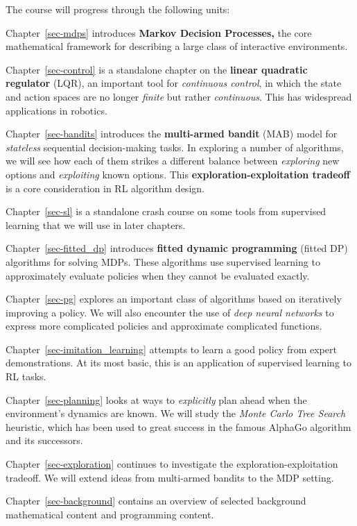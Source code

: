\documentclass[
  letterpaper,
  DIV=11,
  numbers=noendperiod]{scrreprt}
\theoremstyle{plain}
\theoremstyle{plain}
\theoremstyle{definition}
\theoremstyle{definition}
\theoremstyle{remark}
\begin{document}

The course will progress through the following units:

Chapter~\ref{sec-mdps} introduces \textbf{Markov Decision Processes,}
the core mathematical framework for describing a large class of
interactive environments.

Chapter~\ref{sec-control} is a standalone chapter on the \textbf{linear
quadratic regulator} (LQR), an important tool for \emph{continuous
control}, in which the state and action spaces are no longer
\emph{finite} but rather \emph{continuous}. This has widespread
applications in robotics.

Chapter~\ref{sec-bandits} introduces the \textbf{multi-armed bandit}
(MAB) model for \emph{stateless} sequential decision-making tasks. In
exploring a number of algorithms, we will see how each of them strikes a
different balance between \emph{exploring} new options and
\emph{exploiting} known options. This \textbf{exploration-exploitation
tradeoff} is a core consideration in RL algorithm design.

Chapter~\ref{sec-sl} is a standalone crash course on some tools from
supervised learning that we will use in later chapters.

Chapter~\ref{sec-fitted_dp} introduces \textbf{fitted dynamic
programming} (fitted DP) algorithms for solving MDPs. These algorithms
use supervised learning to approximately evaluate policies when they
cannot be evaluated exactly.

Chapter~\ref{sec-pg} explores an important class of algorithms based on
iteratively improving a policy. We will also encounter the use of
\emph{deep neural networks} to express more complicated policies and
approximate complicated functions.

Chapter~\ref{sec-imitation_learning} attempts to learn a good policy
from expert demonstrations. At its most basic, this is an application of
supervised learning to RL tasks.

Chapter~\ref{sec-planning} looks at ways to \emph{explicitly} plan ahead
when the environment's dynamics are known. We will study the \emph{Monte
Carlo Tree Search} heuristic, which has been used to great success in
the famous AlphaGo algorithm and its successors.

Chapter~\ref{sec-exploration} continues to investigate the
exploration-exploitation tradeoff. We will extend ideas from multi-armed
bandits to the MDP setting.

Chapter~\ref{sec-background} contains an overview of selected background
mathematical content and programming content.
\end{document}
